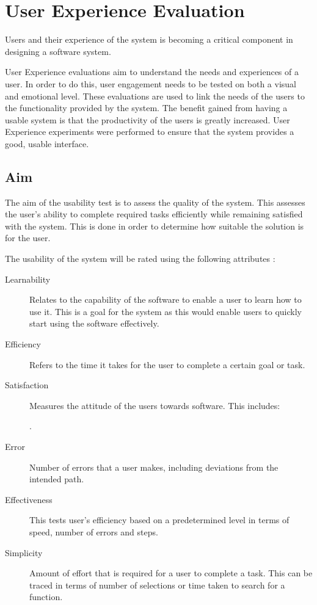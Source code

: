 \documentclass[12pt,a4paper]{report}
\begin{document}
\section{User Experience Evaluation}
Users and their experience of the system is becoming a critical component
in designing a software system\cite{Forlizzi:2004:UEI:1013115.1013152}. 

User Experience evaluations aim to understand the needs and experiences of a user.
In order to do this, user engagement needs to be tested on both a visual and emotional level.
These evaluations are used to link the needs of the users to the functionality provided by the
system. The benefit gained from having a usable system is that the productivity
of the users is greatly increased\cite{nielsen2003usability}. 
User Experience experiments were performed to ensure that the system
provides a good, usable interface. 

\subsection{Aim}
The aim of the usability test is to assess the quality of the system. This 
assesses the user's ability to complete required tasks efficiently while
remaining satisfied with the system\cite{bevan1995measuring}. This is done in
order to determine how suitable the solution is for the user.

The usability of the system will be rated using the following attributes
\cite{doi:10.1207/s15327590ijhc1803_3}:
\begin{description}
\item[Learnability] Relates to the capability of the software to enable a user
    to learn how to use it. This is a goal for the system as this would
    enable users to quickly start using the software effectively.
\item[Efficiency] Refers to the time it takes for the
    user to complete a certain goal or task.
\item[Satisfaction] Measures the attitude of the users towards software. This
    includes: .
    
\item[Error] Number of errors that a user makes, including deviations from 
    the intended path. 
\item[Effectiveness] This tests user's efficiency based on a predetermined level
    in terms of speed, number of errors and steps.
\item[Simplicity] Amount of effort that is required for a user to complete a
    task. This can be traced in terms of number of selections or time taken to
    search for a function.
\end{description}
\end{document}
